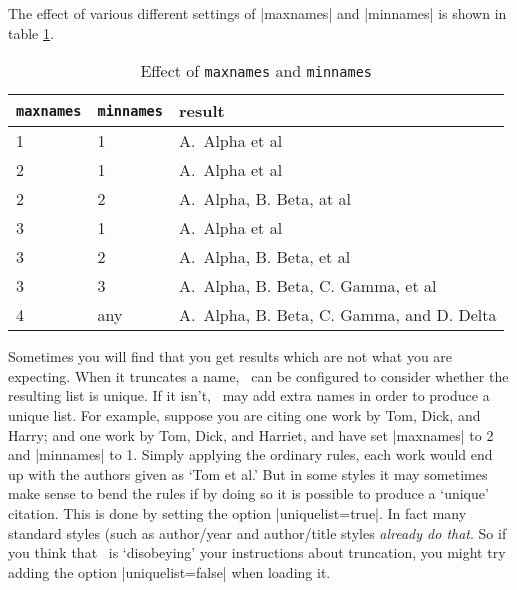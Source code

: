The effect of various different settings of |maxnames| and |minnames|
is shown in table \ref{maxnames}.

\begin{table}
\begin{tabularx}{\textwidth}{llX}
\toprule
\texttt{maxnames} & \texttt{minnames} & \textsf{result} \\
\midrule
1                 &  1                & A.\ Alpha et al \\
2                 &  1                & A.\ Alpha et al \\
2                 &  2                & A.\ Alpha, B. Beta, at al \\
3                 &  1                & A.\ Alpha et al \\
3                 &  2                & A.\ Alpha, B. Beta, et al \\
3                 &  3                & A.\ Alpha, B. Beta, C. Gamma, et al \\
4                 &  any              & A.\ Alpha, B. Beta, C. Gamma, and D. Delta \\
\bottomrule
\end{tabularx}
\caption{Effect of \texttt{maxnames} and \texttt{minnames}\label{maxnames}}
\end{table}

Sometimes you will find that you get results which are not what you
are expecting. When it truncates a name, \biblatex\ can be configured
to consider whether the resulting list is unique. If it isn't,
\biblatex\ may add extra names in order to produce a unique list. For
example, suppose you are citing one work by Tom, Dick, and Harry; and
one work by Tom, Dick, and Harriet, and have set |maxnames| to 2 and
|minnames| to 1. Simply applying the ordinary rules, each work would
end up with the authors given as `Tom et al.' But in some styles it
may sometimes make sense to bend the rules if by doing so it is
possible to produce a `unique' citation. This is done by setting the
option |uniquelist=true|. In fact many standard styles
(such as author/year and author/title styles \emph{already do
  that}. So if you think that \biblatex\ is `disobeying' your
instructions about truncation, you might try adding the option
|uniquelist=false| when loading it.

